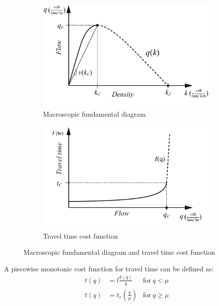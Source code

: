 \documentclass{article}
\begin{document}
\begin{figure}[!ht]
     \centering
     \hfill
     \begin{subfigure}[b]{0.45\textwidth}
         \centering
         \includegraphics[width=\textwidth]{diagram_mfd}
         \caption{Macroscopic fundamental diagram}
         \label{fig:mfd}
     \end{subfigure}
     \hfill
     \begin{subfigure}[b]{0.45\textwidth}
         \centering
         \includegraphics[width=\textwidth]{diagram_traveltime}
        \caption{Travel time cost function}
         \label{fig:traveltime}
     \end{subfigure}
     \hfill
     \caption{Macroscopic fundamental diagram and travel time cost function}
\end{figure}

\noindent A piecewise monotonic cost function for travel time can be defined as:
\begin{subequations}
\begin{align}
    t(q) &= l \frac{k(q)}{q} & \text{for}~q < \mu \\
    t(q) &= t_c \left(\frac{q}{\mu}\right)  & \text{for}~q \geq \mu
\end{align}
\end{subequations}
\end{document}
